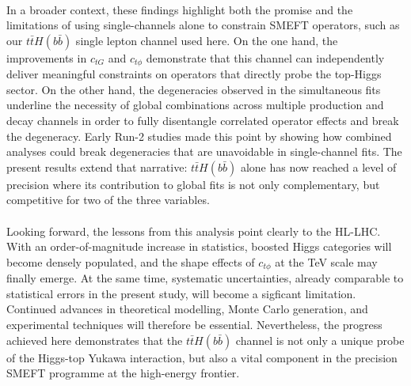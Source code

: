 \\
In a broader context, these findings highlight both the promise and the limitations of using single-channels alone to constrain SMEFT operators, such as our $t\bar{t}H(b\bar{b})$ single lepton channel used here. On the one hand, the improvements in $c_{tG}$ and $c_{t\phi}$ demonstrate that this channel can independently deliver meaningful constraints on operators that directly probe the top-Higgs sector. On the other hand, the degeneracies observed in the simultaneous fits underline the necessity of global combinations across multiple production and decay channels in order to fully disentangle correlated operator effects and break the degeneracy. Early Run-2 studies made this point by showing how combined analyses could break degeneracies that are unavoidable in single-channel fits. The present results extend that narrative: $t\bar{t}H(b\bar{b})$ alone has now reached a level of precision where its contribution to global fits is not only complementary, but competitive for two of the three variables.\\
\\
Looking forward, the lessons from this analysis point clearly to the HL-LHC. With an order-of-magnitude increase in statistics, boosted Higgs categories will become densely populated, and the shape effects of $c_{t\phi}$ at the TeV scale may finally emerge. At the same time, systematic uncertainties, already comparable to statistical errors in the present study, will become a sigficant limitation. Continued advances in theoretical modelling, Monte Carlo generation, and experimental techniques will therefore be essential. Nevertheless, the progress achieved here demonstrates that the $t\bar{t}H(b\bar{b})$ channel is not only a unique probe of the Higgs-top Yukawa interaction, but also a vital component in the precision SMEFT programme at the high-energy frontier.

